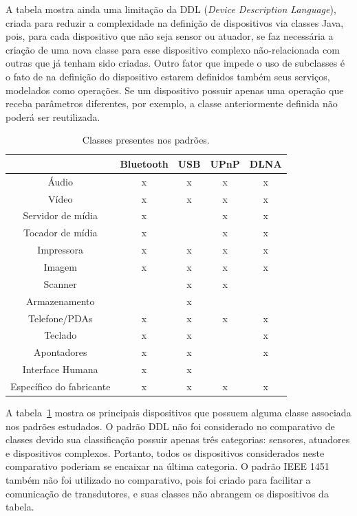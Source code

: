 A tabela mostra ainda uma limitação da DDL (\emph{Device Description Language}), criada para reduzir a complexidade na definição de dispositivos via classes Java, pois, para cada dispositivo que não seja sensor ou atuador, se faz necessária a criação de uma nova classe para esse dispositivo complexo não-relacionada com outras que já tenham sido criadas. Outro fator que impede o uso de subclasses é o fato de na definição do dispositivo estarem definidos também seus serviços, modelados como operações. Se um dispositivo possuir apenas uma operação que receba parâmetros diferentes, por exemplo, a classe anteriormente definida não poderá ser reutilizada. 

\begin{table}
	\caption{Classes presentes nos padrões.}
	\begin{center}
		\begin{tabular}{|ccccc|}
		\hline
									& \textbf{Bluetooth} 	& \textbf{USB}	& \textbf{UPnP} & \textbf{DLNA}	\\
		\hline
		Áudio						& x						& x				& x 			& x				\\
		\hline
		Vídeo						& x						& x				& x				& x				\\
		\hline
		Servidor de mídia			& x						&				& x 			& x				\\
		\hline
		Tocador de mídia			& x						&				& x				& x				\\
		\hline
		Impressora 					& x						& x				& x				& x				\\
		\hline
		Imagem	 					& x						& x				& x				& x				\\
		\hline
		Scanner						& 						& x				& x				& 				\\
		\hline
		Armazenamento				&						& x				& 				& 				\\	
		\hline
		Telefone/PDAs				& x						& x				& x				& x				\\
		\hline
		Teclado						& x						& x				& 				& x				\\
		\hline
		Apontadores					& x						& x				& 				& x 			\\
		\hline
		Interface Humana		 	& x						& x				&  				&  				\\
		\hline
		Específico do fabricante 	& x 					& x				& x				& x				\\
		\hline								
		\end{tabular}
	\end{center}
	\label{tab:comparativoClasses}
\end{table}

A tabela~\ref{tab:comparativoClasses} mostra os principais dispositivos que possuem alguma classe associada nos padrões estudados. O padrão DDL não foi considerado no comparativo de classes devido sua classificação possuir apenas três categorias: sensores, atuadores e dispositivos complexos. Portanto, todos os dispositivos considerados neste comparativo poderiam se encaixar na última categoria. O padrão IEEE 1451 também não foi utilizado no comparativo, pois foi criado para facilitar a comunicação de transdutores, e suas classes não abrangem os dispositivos da tabela.